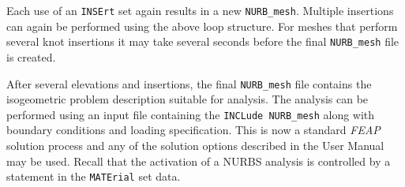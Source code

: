 Each use of an \texttt{INSErt} set again
results in a new \texttt{NURB\_mesh}.  Multiple insertions can again be 
performed using the above loop structure.  For meshes that perform several
knot insertions it may take several seconds before the final \texttt{NURB\_mesh}
file is created.

After several elevations and insertions, the final \texttt{NURB\_mesh} file
contains the isogeometric problem description suitable for analysis.  The
analysis can be performed using an input file containing the
\texttt{INCLude NURB\_mesh} along with boundary conditions and loading
specification.  This is now a standard \textsl{FEAP} solution process and
any of the solution options described in the User Manual may be used.
Recall that the activation of a NURBS analysis is controlled by a statement
in the \texttt{MATErial} set data.
